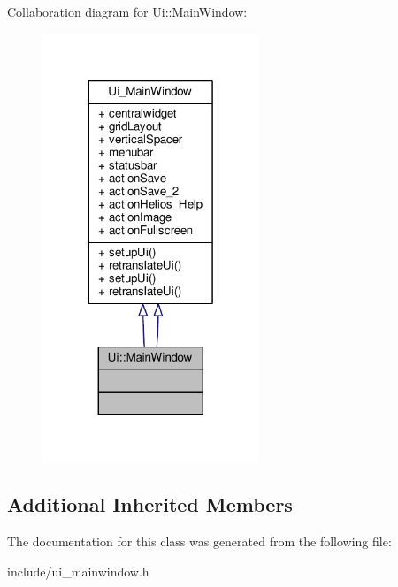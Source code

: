 Collaboration diagram for Ui\-:\-:Main\-Window\-:
\nopagebreak
\begin{figure}[H]
\begin{center}
\leavevmode
\includegraphics[width=184pt]{class_ui_1_1_main_window__coll__graph}
\end{center}
\end{figure}
\subsection*{Additional Inherited Members}


The documentation for this class was generated from the following file\-:\begin{DoxyCompactItemize}
\item 
include/ui\-\_\-mainwindow.\-h\end{DoxyCompactItemize}
